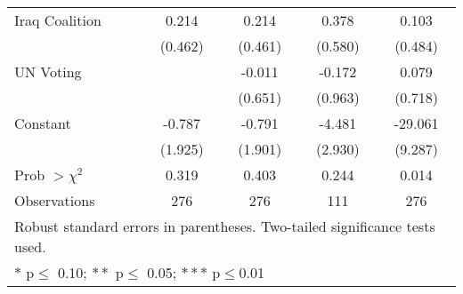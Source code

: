 {\begin{tabular}{l*{4}{c}}
Iraq Coalition  &    0.214         &    0.214         &    0.378         &    0.103         \\
                &  (0.462)         &  (0.461)         &  (0.580)         &  (0.484)         \\
UN Voting       &                  &   -0.011         &   -0.172         &    0.079         \\
                &                  &  (0.651)         &  (0.963)         &  (0.718)         \\
Constant        &   -0.787         &   -0.791         &   -4.481         &  -29.061\sym{***}\\
                &  (1.925)         &  (1.901)         &  (2.930)         &  (9.287)         \\
\hline
Prob $ > \chi^2$&    0.319         &    0.403         &    0.244         &    0.014         \\
Observations    &      276         &      276         &      111         &      276         \\
\hline\hline
\multicolumn{5}{l}{\footnotesize Robust standard errors in parentheses. Two-tailed significance tests used.}\\
\multicolumn{5}{l}{\footnotesize $*$ p$\leq$ 0.10; $**$ p$\leq$ 0.05; $***$ p$\leq$0.01}\\
\end{tabular}
}
